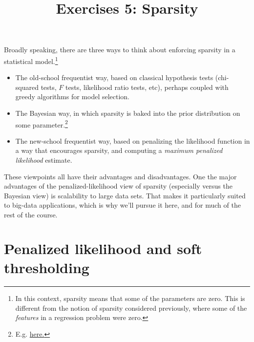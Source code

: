 \documentclass{mynotes}
\title[Exercises 5 $\cdot$ SDS 385]{Exercises 5: Sparsity}
\date{}  %
\begin{document}
\maketitle%

\bigskip


Broadly speaking, there are three ways to think about enforcing sparsity in a statistical model.\footnote{In this context, sparsity means that some of the parameters are zero.  This is different from the notion of sparsity considered previously, where some of the \textit{features} in a regression problem were zero.}
\begin{itemize}
\item The old-school frequentist way, based on classical hypothesis tests (chi-squared tests, $F$ tests, likelihood ratio tests, etc), perhaps coupled with greedy algorithms for model selection.
\item The Bayesian way, in which sparsity is baked into the prior distribution on some parameter.\footnote{E.g. \href{http://www-stat.wharton.upenn.edu/~edgeorge/Research_papers/fastN96.pdf}{here.}}
\item The new-school frequentist way, based on penalizing the likelihood function in a way that encourages sparsity, and computing a \textit{maximum penalized likelihood} estimate.
\end{itemize}

These viewpoints all have their advantages and disadvantages.  One the major advantages of the penalized-likelihood view of sparsity (especially versus the Bayesian view) is scalability to large data sets.  That makes it particularly suited to big-data applications, which is why we'll pursue it here, and for much of the rest of the course.

\section{Penalized likelihood and soft thresholding}
\end{document}
